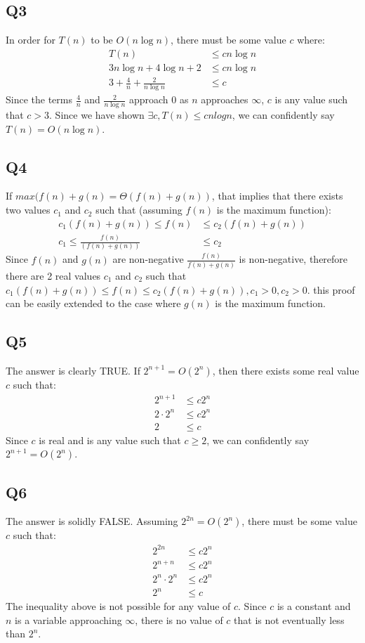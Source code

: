 \documentclass{article}
\begin{document}
		\subsection*{Q3}
		In order for $T(n)$ to be $O(n\log n)$, there must be some value $c$ where:
			\begin{align*}
				T(n) &\leq cn \log n\\
				3n\log n + 4\log n + 2 &\leq cn\log n\\
				3 + \frac{4}{n} + \frac{2}{n\log n} &\leq c
			\end{align*}
		Since the terms $\frac{4}{n}$ and $\frac{2}{n\log n}$ approach 0 as $n$ approaches $\infty$, $c$ is any value such that $c > 3$. Since we have shown $\exists c, T(n) \leq cnlogn$, we can confidently say $T(n) = O(n\log n)$. 
		
		\subsection*{Q4}
		If $max(f(n) + g(n) = \Theta(f(n) + g(n))$, that implies that there exists two values $c_1$ and $c_2$ such that (assuming $f(n)$ is the maximum function):
			\begin{align*}
				c_1(f(n) + g(n)) \leq f(n) &\leq c_2(f(n) + g(n))\\
				c_1 \leq \frac{f(n)}{(f(n) + g(n))} &\leq c_2
			\end{align*} 
		Since $f(n)$ and $g(n)$ are non-negative $\frac{f(n)}{f(n) + g(n)}$ is non-negative, therefore there are 2 real values $c_1$ and $c_2$ such that $c_1(f(n) + g(n)) \leq f(n) \leq c_2(f(n) + g(n)), c_1 > 0, c_2 > 0$. this proof can be easily extended to the case where $g(n)$ is the maximum function.
	
		\subsection*{Q5}
		The answer is clearly TRUE. If $2^{n+1} = O(2^n)$, then there exists some real value $c$ such that:
			\begin{align*}
				2^{n+1} &\leq c2^n\\
				2\cdot2^n &\leq c2^n\\
				2 &\leq c
			\end{align*}
		Since $c$ is real and is any value such that $c \geq 2$, we can confidently say $2^{n+1} = O(2^n)$.
		
		\subsection*{Q6}
		The answer is solidly FALSE. Assuming $2^{2n} = O(2^n)$, there must be some value $c$ such that:
			\begin{align*}
				2^{2n} &\leq c2^n\\
				2^{n+n} &\leq c2^n\\
				2^n\cdot2^n &\leq c2^n\\
				2^n &\leq c
			\end{align*}
		The inequality above is not possible for any value of $c$. Since $c$ is a constant and $n$ is a variable approaching $\infty$, there is no value of $c$ that is not eventually less than $2^n$.
	
\end{document}

